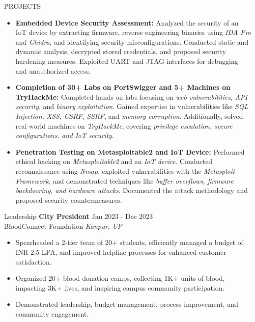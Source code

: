 \documentclass{resume} %
\begin{document}
\begin{rSection}{PROJECTS}
\begin{itemize}
    \item \textbf{Embedded Device Security Assessment:} {Analyzed the security of an IoT device by extracting firmware, reverse engineering binaries using \textit{IDA Pro} and \textit{Ghidra}, and identifying security misconfigurations. Conducted static and dynamic analysis, decrypted stored credentials, and proposed security hardening measures. Exploited UART and JTAG interfaces for debugging and unauthorized access.}
    
    \item \textbf{Completion of 30+ Labs on PortSwigger and 5+ Machines on TryHackMe:} {Completed hands-on labs focusing on \textit{web vulnerabilities, API security}, and \textit{binary exploitation}. Gained expertise in vulnerabilities like \textit{SQL Injection, XSS, CSRF, SSRF}, and \textit{memory corruption}. Additionally, solved real-world machines on \textit{TryHackMe}, covering \textit{privilege escalation, secure configurations, and IoT security}.}

    \item \textbf{Penetration Testing on Metasploitable2 and IoT Device:} {Performed ethical hacking on \textit{Metasploitable2} and an \textit{IoT device}. Conducted reconnaissance using \textit{Nmap}, exploited vulnerabilities with the \textit{Metasploit Framework}, and demonstrated techniques like \textit{buffer overflows, firmware backdooring, and hardware attacks}. Documented the attack methodology and proposed security countermeasures.}
\end{itemize}
\end{rSection}


\begin{rSection}{Leadership}
\textbf{City President} \hfill Jan 2023 - Dec 2023\\
BloodConnect Foundation \hfill \textit{Kanpur, UP}
\begin{itemize}[noitemsep]
    \item Spearheaded a 2-tier team of 20+ students, efficiently managed a budget of INR 2.5 LPA, and improved helpline processes for enhanced customer satisfaction.
    \item Organized 20+ blood donation camps, collecting 1K+ units of blood, impacting 3K+ lives, and inspiring campus community participation.
    \item Demonstrated leadership, budget management, process improvement, and community engagement.
\end{itemize}
\end{rSection}
\end{document}
